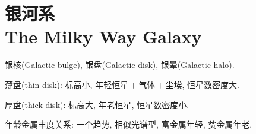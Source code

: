 \chapter{银河系\\The Milky Way Galaxy}

银核(Galactic bulge), 银盘(Galactic disk), 银晕(Galactic halo).

薄盘(thin disk): 标高小, 年轻恒星$\!+\!$气体$\!+\!$尘埃, 恒星数密度大.

厚盘(thick disk): 标高大, 年老恒星, 恒星数密度小.

年龄金属丰度关系: 一个趋势, 相似光谱型, 富金属年轻, 贫金属年老.
